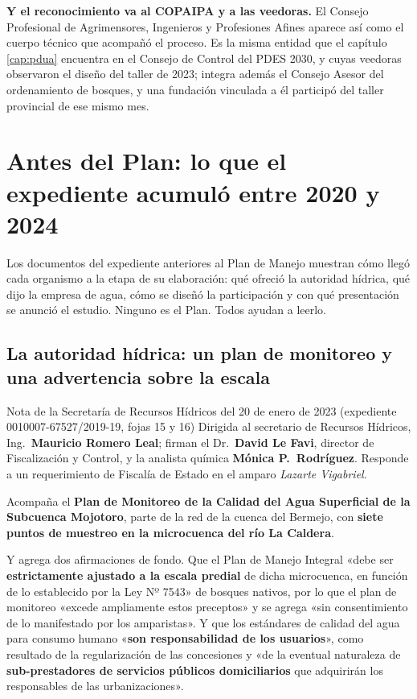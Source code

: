 \textbf{Y el reconocimiento va al COPAIPA y a las veedoras.} El Consejo Profesional de
Agrimensores, Ingenieros y Profesiones Afines aparece así como el cuerpo técnico que acompañó
el proceso. Es la misma entidad que el capítulo \ref{cap:pdua} encuentra en el Consejo de Control del PDES 2030, y cuyas veedoras observaron el diseño del taller de 2023; integra además el Consejo Asesor del ordenamiento de bosques, y una fundación vinculada a él participó del taller provincial de ese mismo mes.

\section{Antes del Plan: lo que el expediente acumuló entre 2020 y 2024}

Los documentos del expediente anteriores al Plan de Manejo muestran cómo llegó cada organismo a la etapa de su elaboración: qué ofreció la autoridad hídrica, qué dijo la empresa de agua, cómo se diseñó la participación y con qué presentación se anunció el estudio. Ninguno es el Plan. Todos ayudan a leerlo.

\subsection*{La autoridad hídrica: un plan de monitoreo y una advertencia sobre la escala}

\begin{ficha}{Nota de la Secretaría de Recursos Hídricos del 20 de enero de 2023 (expediente 0010007-67527/2019-19, fojas 15 y 16)}
Dirigida al secretario de Recursos Hídricos, Ing.\ \textbf{Mauricio Romero Leal}; firman el Dr.\ \textbf{David Le Favi}, director de Fiscalización y Control, y la analista química \textbf{Mónica P.\ Rodríguez}. Responde a un requerimiento de Fiscalía de Estado en el amparo \textit{Lazarte Vigabriel}.

Acompaña el \textbf{Plan de Monitoreo de la Calidad del Agua Superficial de la Subcuenca Mojotoro}, parte de la red de la cuenca del Bermejo, con \textbf{siete puntos de muestreo en la microcuenca del río La Caldera}.

Y agrega dos afirmaciones de fondo. Que el Plan de Manejo Integral «debe ser \textbf{estrictamente ajustado a la escala predial} de dicha microcuenca, en función de lo establecido por la Ley Nº 7543» de bosques nativos, por lo que el plan de monitoreo «excede ampliamente estos preceptos» y se agrega «sin consentimiento de lo manifestado por los amparistas». Y que los estándares de calidad del agua para consumo humano «\textbf{son responsabilidad de los usuarios}», como resultado de la regularización de las concesiones y «de la eventual naturaleza de \textbf{sub-prestadores de servicios públicos domiciliarios} que adquirirán los responsables de las urbanizaciones».
\end{ficha}

